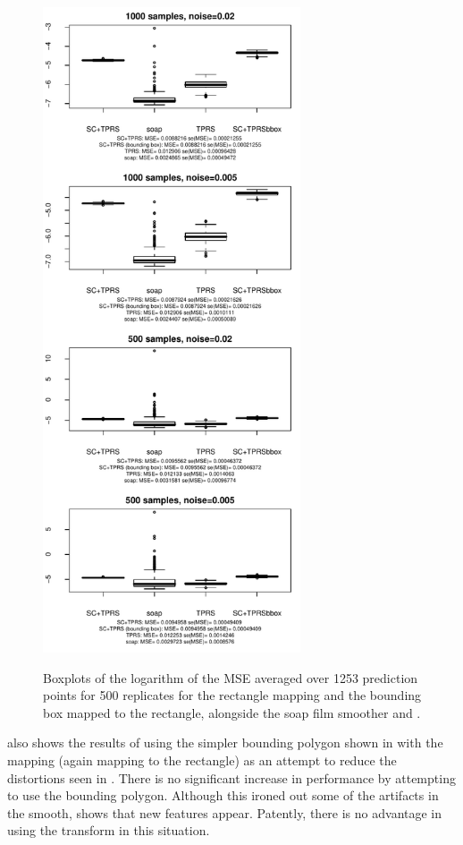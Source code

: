 \begin{figure}[p]
\centering
\includegraphics[width=3in]{sc/figs/wigglytop2-boxplot.pdf} \\
\caption{Boxplots of the logarithm of the MSE averaged over 1253 prediction points for 500 replicates for the rectangle mapping and the bounding box mapped to the rectangle, alongside the soap film smoother and \tprs.}
\label{wigglytop2-boxplots}
\end{figure}


 also shows the results of using the simpler bounding polygon shown in  with the \sch mapping (again mapping to the rectangle) as  an attempt to reduce the distortions seen in . There is no significant increase in performance by attempting to use the bounding polygon. Although this ironed out some of the artifacts in the smooth,  shows that new features appear. Patently, there is no advantage in using the \sch transform in this situation.



